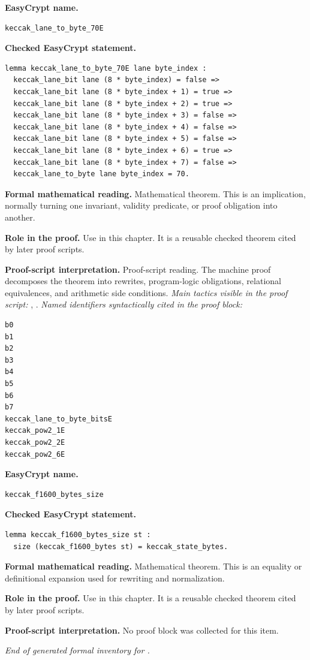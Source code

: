 \begin{formaltheorem}
\noindent\textbf{EasyCrypt name.}
\begin{lstlisting}[language=EasyCrypt,basicstyle=\ttfamily\scriptsize]
keccak_lane_to_byte_70E
\end{lstlisting}
\noindent\textbf{Checked EasyCrypt statement.}
\begin{lstlisting}[language=EasyCrypt,basicstyle=\ttfamily\scriptsize]
lemma keccak_lane_to_byte_70E lane byte_index :
  keccak_lane_bit lane (8 * byte_index) = false =>
  keccak_lane_bit lane (8 * byte_index + 1) = true =>
  keccak_lane_bit lane (8 * byte_index + 2) = true =>
  keccak_lane_bit lane (8 * byte_index + 3) = false =>
  keccak_lane_bit lane (8 * byte_index + 4) = false =>
  keccak_lane_bit lane (8 * byte_index + 5) = false =>
  keccak_lane_bit lane (8 * byte_index + 6) = true =>
  keccak_lane_bit lane (8 * byte_index + 7) = false =>
  keccak_lane_to_byte lane byte_index = 70.
\end{lstlisting}
\noindent\textbf{Formal mathematical reading.}
Mathematical theorem. This is an implication, normally turning one invariant, validity predicate, or proof obligation into another.

\noindent\textbf{Role in the proof.}
Use in this chapter. It is a reusable checked theorem cited by later proof scripts.

\noindent\textbf{Proof-script interpretation.}
Proof-script reading. The machine proof decomposes the theorem into rewrites, program-logic obligations, relational equivalences, and arithmetic side conditions.
\emph{Main tactics visible in the proof script:} , .
\emph{Named identifiers syntactically cited in the proof block:}
\begin{lstlisting}[language=EasyCrypt,basicstyle=\ttfamily\scriptsize]
b0
b1
b2
b3
b4
b5
b6
b7
keccak_lane_to_byte_bitsE
keccak_pow2_1E
keccak_pow2_2E
keccak_pow2_6E
\end{lstlisting}

\end{formaltheorem}

\begin{formaltheorem}
\noindent\textbf{EasyCrypt name.}
\begin{lstlisting}[language=EasyCrypt,basicstyle=\ttfamily\scriptsize]
keccak_f1600_bytes_size
\end{lstlisting}
\noindent\textbf{Checked EasyCrypt statement.}
\begin{lstlisting}[language=EasyCrypt,basicstyle=\ttfamily\scriptsize]
lemma keccak_f1600_bytes_size st :
  size (keccak_f1600_bytes st) = keccak_state_bytes.
\end{lstlisting}
\noindent\textbf{Formal mathematical reading.}
Mathematical theorem. This is an equality or definitional expansion used for rewriting and normalization.

\noindent\textbf{Role in the proof.}
Use in this chapter. It is a reusable checked theorem cited by later proof scripts.

\noindent\textbf{Proof-script interpretation.}
No proof block was collected for this item.

\end{formaltheorem}

\medskip
\noindent\emph{End of generated formal inventory for .}
